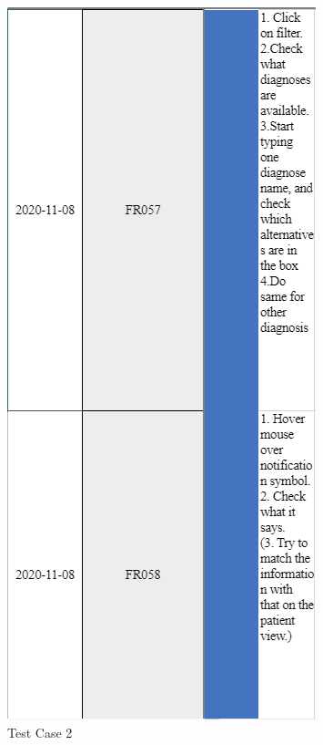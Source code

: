 \begin{figure}[ht!]
\begin{minipage}[t]{0.5\textwidth}
    \includegraphics[scale=0.75]{Pictures/TestCase2.PNG}
    \caption{Test Case 2}
\end{minipage}
\end{figure}

